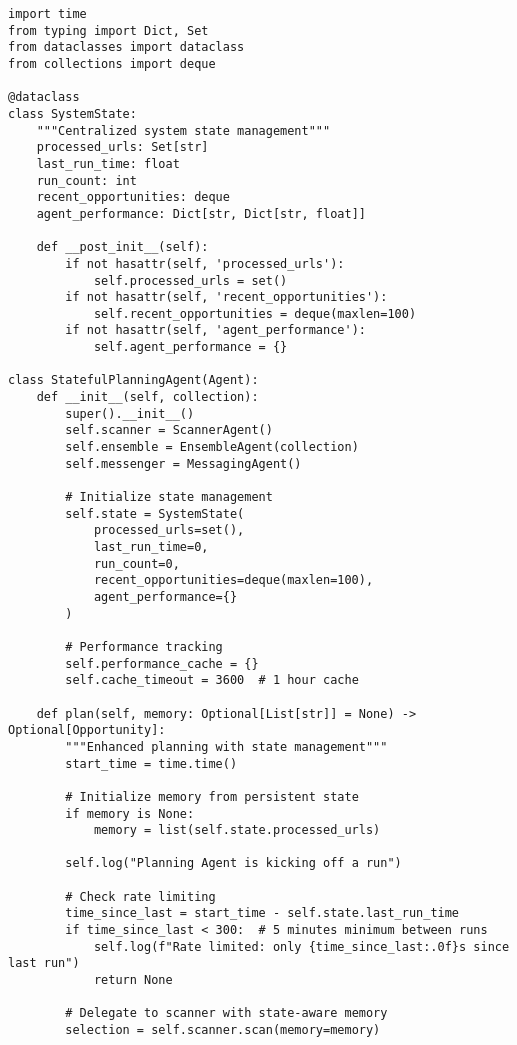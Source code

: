 \begin{lstlisting}[caption=Enhanced State Management System]
import time
from typing import Dict, Set
from dataclasses import dataclass
from collections import deque

@dataclass
class SystemState:
    """Centralized system state management"""
    processed_urls: Set[str]
    last_run_time: float
    run_count: int
    recent_opportunities: deque
    agent_performance: Dict[str, Dict[str, float]]
    
    def __post_init__(self):
        if not hasattr(self, 'processed_urls'):
            self.processed_urls = set()
        if not hasattr(self, 'recent_opportunities'):
            self.recent_opportunities = deque(maxlen=100)
        if not hasattr(self, 'agent_performance'):
            self.agent_performance = {}

class StatefulPlanningAgent(Agent):
    def __init__(self, collection):
        super().__init__()
        self.scanner = ScannerAgent()
        self.ensemble = EnsembleAgent(collection)
        self.messenger = MessagingAgent()
        
        # Initialize state management
        self.state = SystemState(
            processed_urls=set(),
            last_run_time=0,
            run_count=0,
            recent_opportunities=deque(maxlen=100),
            agent_performance={}
        )
        
        # Performance tracking
        self.performance_cache = {}
        self.cache_timeout = 3600  # 1 hour cache
    
    def plan(self, memory: Optional[List[str]] = None) -> Optional[Opportunity]:
        """Enhanced planning with state management"""
        start_time = time.time()
        
        # Initialize memory from persistent state
        if memory is None:
            memory = list(self.state.processed_urls)
        
        self.log("Planning Agent is kicking off a run")
        
        # Check rate limiting
        time_since_last = start_time - self.state.last_run_time
        if time_since_last < 300:  # 5 minutes minimum between runs
            self.log(f"Rate limited: only {time_since_last:.0f}s since last run")
            return None
        
        # Delegate to scanner with state-aware memory
        selection = self.scanner.scan(memory=memory)
        

\end{lstlisting}
